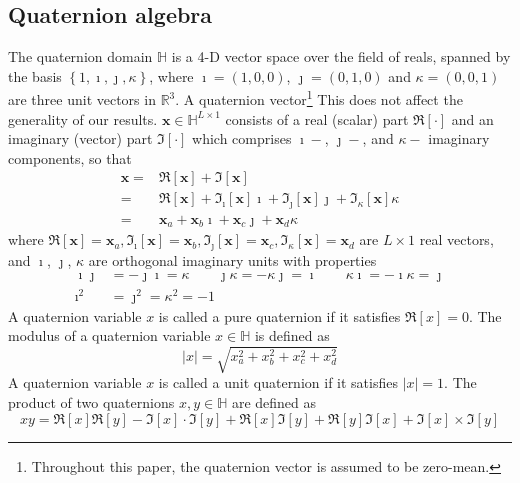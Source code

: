 \documentclass[review]{elsarticle}
\theoremstyle{plain}
\theoremstyle{remark}
\theoremstyle{plain}
\theoremstyle{definition}
\theoremstyle{prop}
\theoremstyle{definition}
\theoremstyle{plain}
\theoremstyle{plain}
\begin{document}
\subsection{Quaternion algebra}
The quaternion domain $\mathbb{H}$ is a 4-D vector space over the
field of reals, spanned by the basis $\left\{ 1,\imath,\jmath,\kappa\right\}$, where $\imath=(1,0,0)$, $\jmath=(0,1,0)$ and $\kappa=(0,0,1)$ are three unit vectors in $\mathbb{R}^3$.
A quaternion vector\footnote{Throughout this paper, the quaternion vector is assumed to be zero-mean.} This does not affect the generality of our results. $\mathbf{x}\in \mathbb{H}^{L\times1}$ consists of a real (scalar) part $\mathfrak{R}[\cdot]$ and an imaginary (vector) part $\mathfrak{I}[\cdot]$ which comprises $\imath-$, $\jmath-$, and $\kappa-$ imaginary components, so that
\begin{equation}
\begin{split}
\mathbf{x}=&\mathfrak{R}[\mathbf{x}]+\mathfrak{I}[\mathbf{x}]\\
    =&\mathfrak{R}[\mathbf{x}]+\mathfrak{I}_\imath[\mathbf{x}]\imath+\mathfrak{I}_\jmath[\mathbf{x}]\jmath+\mathfrak{I}_\kappa[\mathbf{x}]\kappa \\  =&\mathbf{x}_a+\mathbf{x}_b\imath+\mathbf{x}_c\jmath+\mathbf{x}_d\kappa
\end{split} \label{eq:quatvector}
\end{equation}
\noindent where $\mathfrak{R}[\mathbf{x}]=\mathbf{x}_a, \mathfrak{I}_\imath[\mathbf{x}]=\mathbf{x}_b, \mathfrak{I}_\jmath[\mathbf{x}]=\mathbf{x}_c, \mathfrak{I}_\kappa[\mathbf{x}]=\mathbf{x}_d$ are $L\times1$ real vectors, and $\imath$, $\jmath$, $\kappa$ are orthogonal imaginary units with properties
\begin{equation}
\begin{split}
\imath\jmath&=-\jmath\imath=\kappa  \qquad \jmath\kappa=-\kappa\jmath=\imath \qquad \kappa\imath=-\imath\kappa=\jmath \\
\imath^{2}&=\jmath^{2}=\kappa^{2}=-1
\end{split} \label{eq:units}
\end{equation}
A quaternion variable $x$ is called a pure quaternion if it satisfies $\mathfrak{R}[x]=0$. The modulus of a quaternion variable $x\in\mathbb{H}$ is defined as \[|x|=\sqrt{x_{a}^{2}+x_{b}^{2}+x_{c}^{2}+x_{d}^{2}}\]
A quaternion variable $x$ is called a unit quaternion if it satisfies $|x|=1$. 
The product of two quaternions $x,y\in\mathbb{H}$ are defined as 
\[
xy=\mathfrak{R}[x] \mathfrak{R}[y]-\mathfrak{I}[x]\cdot\mathfrak{I}[y]+\mathfrak{R}[x]\mathfrak{I}[y]+\mathfrak{R}[y]\mathfrak{I}[x]+\mathfrak{I}[x]\times\mathfrak{I}[y]
\] 
\end{document}

